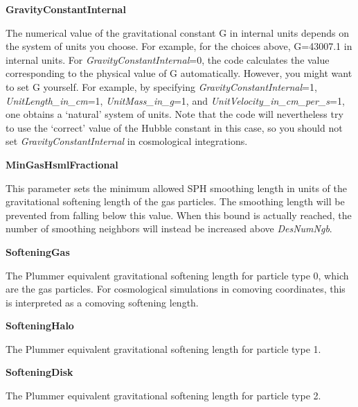 \begin{DoxyItemize}
\item {\bfseries GravityConstantInternal} \par
 The numerical value of the gravitational constant G in internal units depends on the system of units you choose. For example, for the choices above, G=43007.1 in internal units. For {\itshape GravityConstantInternal\/}=0, the code calculates the value corresponding to the physical value of G automatically. However, you might want to set G yourself. For example, by specifying {\itshape GravityConstantInternal\/}=1, {\itshape UnitLength\_\-in\_\-cm\/}=1, {\itshape UnitMass\_\-in\_\-g\/}=1, and {\itshape UnitVelocity\_\-in\_\-cm\_\-per\_\-s\/}=1, one obtains a `natural' system of units. Note that the code will nevertheless try to use the `correct' value of the Hubble constant in this case, so you should not set {\itshape GravityConstantInternal\/} in cosmological integrations.
\end{DoxyItemize}


\begin{DoxyItemize}
\item {\bfseries MinGasHsmlFractional} \par
 This parameter sets the minimum allowed SPH smoothing length in units of the gravitational softening length of the gas particles. The smoothing length will be prevented from falling below this value. When this bound is actually reached, the number of smoothing neighbors will instead be increased above {\itshape DesNumNgb\/}.
\end{DoxyItemize}


\begin{DoxyItemize}
\item {\bfseries SofteningGas} \par
 The Plummer equivalent gravitational softening length for particle type 0, which are the gas particles. For cosmological simulations in comoving coordinates, this is interpreted as a comoving softening length.
\end{DoxyItemize}


\begin{DoxyItemize}
\item {\bfseries SofteningHalo} \par
 The Plummer equivalent gravitational softening length for particle type 1.
\end{DoxyItemize}


\begin{DoxyItemize}
\item {\bfseries SofteningDisk} \par
 The Plummer equivalent gravitational softening length for particle type 2.
\end{DoxyItemize}


